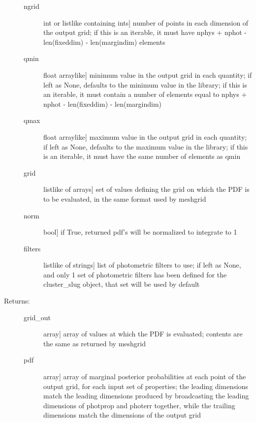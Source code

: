 \documentclass[letterpaper,10pt,english]{sphinxmanual}
\begin{document}
\begin{fulllineitems}
\begin{fulllineitems}
\begin{description}
\begin{description}
\item[{ngrid}] \leavevmode{[}int or listlike containing ints{]}
number of points in each dimension of the output grid;
if this is an iterable, it must have nphys + nphot -
len(fixeddim) - len(margindim) elements

\item[{qmin}] \leavevmode{[}float \textbar{} arraylike{]}
minimum value in the output grid in each quantity; if
left as None, defaults to the minimum value in the
library; if this is an iterable, it must contain a
number of elements equal to nphys + nphot -
len(fixeddim) - len(margindim)

\item[{qmax}] \leavevmode{[}float \textbar{} arraylike{]}
maximum value in the output grid in each quantity; if
left as None, defaults to the maximum value in the
library; if this is an iterable, it must have the same
number of elements as qmin

\item[{grid}] \leavevmode{[}listlike of arrays{]}
set of values defining the grid on which the PDF is to
be evaluated, in the same format used by meshgrid

\item[{norm}] \leavevmode{[}bool{]}
if True, returned pdf’s will be normalized to integrate
to 1

\item[{filters}] \leavevmode{[}listlike of strings{]}
list of photometric filters to use; if left as None, and
only 1 set of photometric filters has been defined for
the cluster\_slug object, that set will be used by
default

\end{description}

\item[{Returns:}] \leavevmode\begin{description}
\item[{grid\_out}] \leavevmode{[}array{]}
array of values at which the PDF is evaluated; contents
are the same as returned by meshgrid

\item[{pdf}] \leavevmode{[}array{]}
array of marginal posterior probabilities at each point
of the output grid, for each input set of properties; the leading
dimensions match the leading dimensions produced by
broadcasting the leading dimensions of photprop and
photerr together, while the trailing dimensions match
the dimensions of the output grid

\end{description}


\end{description}
\end{fulllineitems}
\end{fulllineitems}
\end{document}
